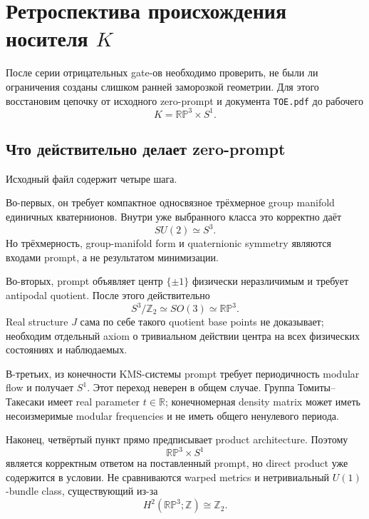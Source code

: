 \chapter{Ретроспектива происхождения носителя \texorpdfstring{\(K\)}{K}}

После серии отрицательных gate-ов необходимо проверить, не были ли ограничения
созданы слишком ранней заморозкой геометрии. Для этого восстановим цепочку
от исходного zero-prompt и документа \texttt{TOE.pdf} до рабочего
\begin{equation}
 K=\mathbb{RP}^3\times S^1.
\end{equation}

\section{Что действительно делает zero-prompt}

Исходный файл
 содержит четыре шага.

Во-первых, он требует компактное односвязное трёхмерное group manifold
единичных кватернионов. Внутри уже выбранного класса это корректно даёт
\begin{equation}
 SU(2)\simeq S^3.
\end{equation}
Но трёхмерность, group-manifold form и quaternionic symmetry являются
входами prompt, а не результатом минимизации.

Во-вторых, prompt объявляет центр \(\{\pm1\}\) физически неразличимым и
требует antipodal quotient. После этого действительно
\begin{equation}
 S^3/\mathbb Z_2\simeq SO(3)\simeq\mathbb{RP}^3.
\end{equation}
Real structure \(J\) сама по себе такого quotient base points не доказывает;
необходим отдельный axiom о тривиальном действии центра на всех физических
состояниях и наблюдаемых.

В-третьих, из конечности KMS-системы prompt требует периодичность modular
flow и получает \(S^1\). Этот переход неверен в общем случае. Группа
Томиты--Такесаки имеет real parameter \(t\in\mathbb R\); конечномерная
density matrix может иметь несоизмеримые modular frequencies и не иметь
общего ненулевого периода.

Наконец, четвёртый пункт прямо предписывает product architecture. Поэтому
\begin{equation}
 \mathbb{RP}^3\times S^1
\end{equation}
является корректным ответом на поставленный prompt, но direct product уже
содержится в условии. Не сравниваются warped metrics и нетривиальный
\(U(1)\)-bundle class, существующий из-за
\begin{equation}
 H^2(\mathbb{RP}^3;\mathbb Z)\cong\mathbb Z_2.
\end{equation}

